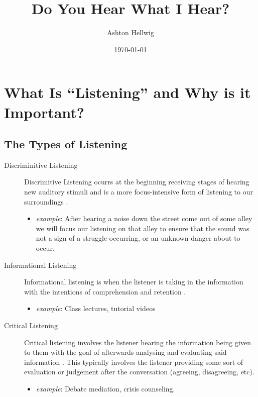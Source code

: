 \documentclass[stu,12pt]{apa7}
\title{%
    Do You Hear What I Hear?
  }
\author{Ashton Hellwig}
\date{\today}
\begin{document}
  \maketitle


  \section{What Is ``Listening'' and Why is it Important?}
    \subsection{The Types of Listening}
      \begin{description}
        \item[Discriminitive Listening]
          Discrimitive Listening ocurrs at the beginning receiving stages of
            hearing new auditory stimuli and is a more focus-intensive form
            of listening to our surroundings
            \parencite[pp. 333]{noauthor_communication_2013}.
          \begin{itemize}
            \item \textit{example}: After hearing a noise down the street come
              out of some alley we will focus our listening on that alley to
              ensure that the sound was not a sign of a struggle occurring, or
              an unknown danger about to occur.
          \end{itemize}
        \item[Informational Listening]
          Informational listening is when the listener is taking in the
            information with the intentions of comprehension and retention
            \parencite[pp. 334]{noauthor_communication_2013}.
          \begin{itemize}
            \item \textit{example}: Class lectures, tutorial videos
          \end{itemize}
        \item[Critical Listening]
          Critical listening involves the listener hearing the information being
            given to them with the goal of afterwards analysing and evaluating
            said information
            \parencite[pp. 334--335]{noauthor_communication_2013}. This
            typically involves the listener providing some sort of evaluation or
            judgement after the conversation (agreeing, disagreeing, etc).
          \begin{itemize}
            \item \textit{example}: Debate mediation, crisis counseling.

\end{itemize}
\end{description}
\end{document}
